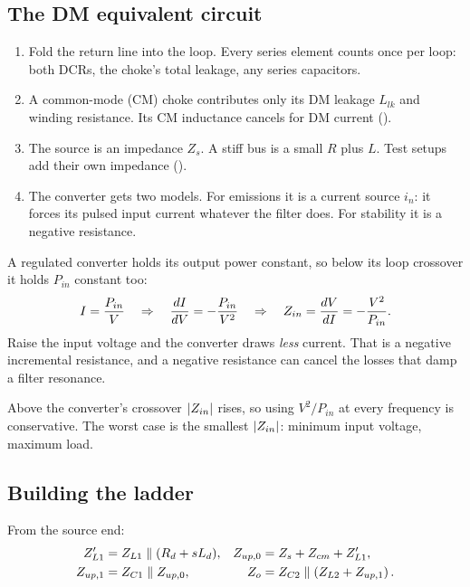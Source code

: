\subsection{The DM equivalent circuit}

\begin{enumerate}
	\item Fold the return line into the loop. Every series element counts once
	      per loop: both DCRs, the choke's total leakage, any series capacitors.
	\item A common-mode (CM) choke contributes only its DM leakage $L_{lk}$ and
	      winding resistance. Its CM inductance cancels for DM current ().
	\item The source is an impedance $Z_s$. A stiff bus is a small $R$ plus $L$.
	      Test setups add their own impedance ().
	\item The converter gets two models. For emissions it is a current source
	      $i_n$: it forces its pulsed input current whatever the filter does.
	      For stability it is a negative resistance.
\end{enumerate}

\begin{derivation}
	A regulated converter holds its output power constant, so below its loop
	crossover it holds $P_{in}$ constant too:
	\[
		I = \frac{P_{in}}{V}
		\quad\Rightarrow\quad
		\frac{dI}{dV} = -\frac{P_{in}}{V^2}
		\quad\Rightarrow\quad
		Z_{in} = \frac{dV}{dI} = -\frac{V^2}{P_{in}}.
	\]
	Raise the input voltage and the converter draws \emph{less} current.
	That is a negative incremental resistance, and a negative resistance can
	cancel the losses that damp a filter resonance.
\end{derivation}

Above the converter's crossover $\lvert Z_{in}\rvert$ rises, so using $V^2/P_{in}$ at
every frequency is conservative. The worst case is the smallest $\lvert Z_{in}\rvert$:
minimum input voltage, maximum load.

\subsection{Building the ladder}

From the source end:
\begin{equation}\label{eq:ladder}
	\begin{aligned}
		Z_{L1}'   & = Z_{L1} \parallel (R_d + sL_d),  & Z_{up,0} & = Z_s + Z_{cm} + Z_{L1}',                   \\
		Z_{up,1}  & = Z_{C1} \parallel Z_{up,0},      & Z_o      & = Z_{C2} \parallel \left(Z_{L2} + Z_{up,1}\right).
	\end{aligned}
\end{equation}


